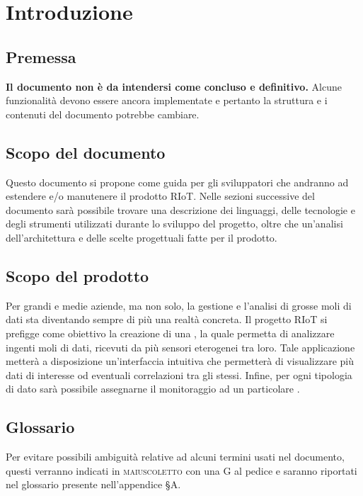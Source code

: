 \section{Introduzione}
	\subsection{Premessa}
		\textbf{Il documento non è da intendersi come concluso e definitivo.} Alcune funzionalità devono essere ancora implementate e pertanto la struttura e i contenuti del documento potrebbe cambiare.
	\subsection{Scopo del documento}
		Questo documento si propone come guida per gli sviluppatori che andranno ad estendere e/o manutenere il prodotto RIoT. 
		\newline
		Nelle sezioni successive del documento sarà possibile trovare una descrizione dei linguaggi, delle tecnologie e degli strumenti utilizzati durante lo sviluppo del progetto, oltre che un'analisi dell'architettura e delle scelte progettuali fatte per il prodotto.
	\subsection{Scopo del prodotto}
	 	Per grandi e medie aziende, ma non solo, la gestione e l'analisi di grosse moli di dati sta diventando sempre di più una realtà concreta.
	 	\newline
		Il progetto RIoT si prefigge come obiettivo la creazione di una , la quale permetta di analizzare ingenti moli di dati, ricevuti da più sensori eterogenei tra loro. Tale applicazione metterà a disposizione un'interfaccia intuitiva che permetterà di visualizzare più dati di interesse od eventuali correlazioni tra gli stessi. Infine, per ogni tipologia di dato sarà possibile assegnarne il monitoraggio ad un particolare .	
	\subsection{Glossario}
		Per evitare possibili ambiguità relative ad alcuni termini usati nel documento, questi verranno indicati in \textsc{maiuscoletto} con una G al pedice e saranno riportati nel glossario presente nell'appendice \S A.
